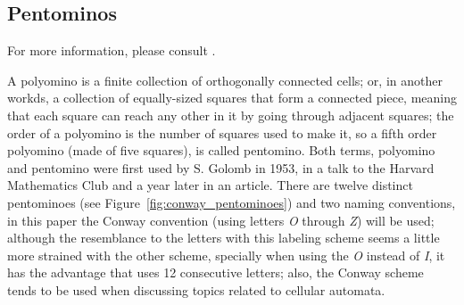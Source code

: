 
\subsection{Pentominos}
For more information, please consult \cite{language-and-automata-journal,
polyomino-life-wiki, rit-people, rpentomino-life-wiki, methuselah-life-wiki}.

A polyomino is a finite collection of orthogonally connected cells; or, in
another workds, a collection of equally-sized squares that form a connected
piece, meaning that each square can reach any other in it by going through
adjacent squares; the order of a polyomino is the number of squares used to
make it, so a fifth order polyomino (made of five squares), is called
pentomino. Both terms, polyomino and pentomino were first used by S. Golomb in
1953, in a talk to the Harvard Mathematics Club and a year later in an article.
There are twelve distinct pentominoes (see
Figure~\ref{fig:conway_pentominoes}) and two naming conventions, in
this paper the Conway convention (using letters \textit{O} through \textit{Z})
will be used; although the resemblance to the letters with this labeling scheme
seems a little more strained with the other scheme, specially when using the
\textit{O} instead of \textit{I}, it has the advantage that uses 12
consecutive letters; also, the Conway scheme tends to be used when discussing
topics related to cellular automata.

